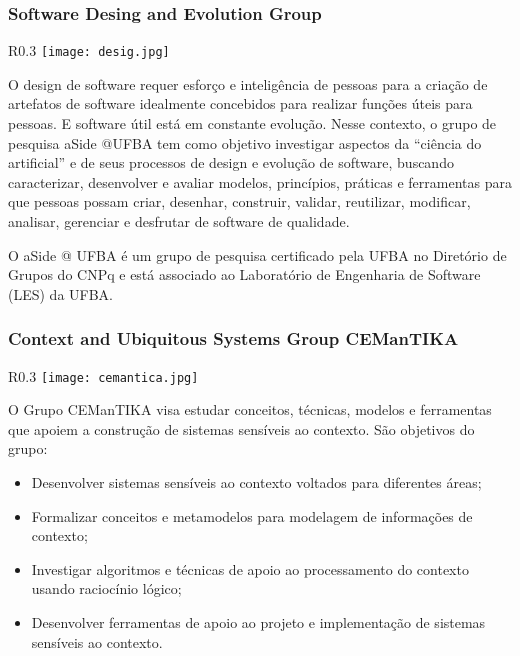 \subsubsection{Software Desing and Evolution Group}
\begin{wrapfigure}{R}{0.3\textwidth}
            \centering
            \texttt{[image: desig.jpg]}
        \end{wrapfigure}
O design de software requer esforço e inteligência de pessoas para a criação de artefatos de software idealmente concebidos para realizar funções úteis para pessoas. E software útil está em constante evolução. Nesse contexto, o grupo de pesquisa aSide @UFBA tem como objetivo investigar aspectos da ``ciência do artificial'' e de seus processos de design e evolução de software, buscando caracterizar, desenvolver e avaliar modelos, princípios, práticas e ferramentas para que pessoas possam criar, desenhar, construir, validar, reutilizar, modificar, analisar, gerenciar e desfrutar de software de qualidade. 
	  
	  O aSide @ UFBA é um grupo de pesquisa certificado pela UFBA no Diretório de Grupos do CNPq e está associado ao Laboratório de Engenharia de Software (LES) da UFBA.


\subsubsection{Context and Ubiquitous Systems Group CEManTIKA}
\begin{wrapfigure}{R}{0.3\textwidth}
            \centering
            \texttt{[image: cemantica.jpg]}
        \end{wrapfigure}
O Grupo CEManTIKA visa estudar conceitos, técnicas, modelos e ferramentas que apoiem a construção de sistemas sensíveis ao contexto. São objetivos do grupo: 

\begin{itemize}
\item Desenvolver sistemas sensíveis ao contexto voltados para diferentes áreas; 
\item  Formalizar conceitos e metamodelos para modelagem de informações de contexto; 
\item  Investigar algoritmos e técnicas de apoio ao processamento do contexto usando raciocínio lógico; 
\item Desenvolver ferramentas de apoio ao projeto e implementação de sistemas sensíveis ao contexto. 
\end{itemize}

